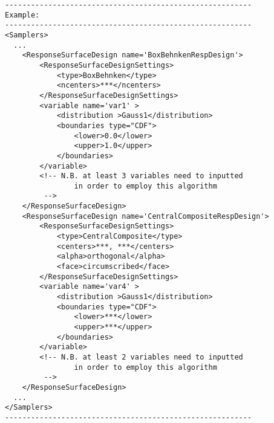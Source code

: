 \begin{lstlisting}[style=XML]
---------------------------------------------------------
Example:
---------------------------------------------------------
<Samplers>
  ...
    <ResponseSurfaceDesign name='BoxBehnkenRespDesign'>
        <ResponseSurfaceDesignSettings>
            <type>BoxBehnken</type>
            <ncenters>***</ncenters>
        </ResponseSurfaceDesignSettings>
        <variable name='var1' >
            <distribution >Gauss1</distribution>
            <boundaries type="CDF">
                <lower>0.0</lower>
                <upper>1.0</upper>
            </boundaries>
        </variable>
        <!-- N.B. at least 3 variables need to inputted 
                in order to employ this algorithm
         -->
    </ResponseSurfaceDesign>
    <ResponseSurfaceDesign name='CentralCompositeRespDesign'>
        <ResponseSurfaceDesignSettings>
            <type>CentralComposite</type>
            <centers>***, ***</centers>
            <alpha>orthogonal</alpha>
            <face>circumscribed</face>
        </ResponseSurfaceDesignSettings>
        <variable name='var4' >
            <distribution >Gauss1</distribution>
            <boundaries type="CDF">
                <lower>***</lower>
                <upper>***</upper>
            </boundaries>
        </variable>
        <!-- N.B. at least 2 variables need to inputted 
                in order to employ this algorithm
         -->        
    </ResponseSurfaceDesign>
  ...
</Samplers>
---------------------------------------------------------
\end{lstlisting}


